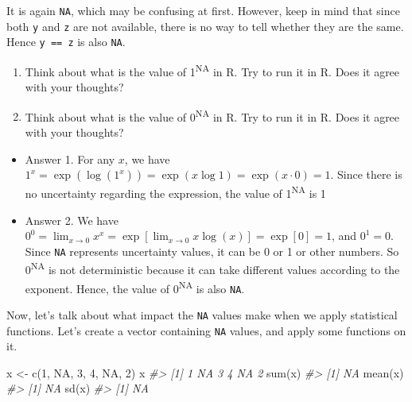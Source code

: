 \documentclass[
]{book}
\newenvironment{Shaded}{\begin{snugshade}}{\end{snugshade}}
\newcommand{\CommentTok}[1]{\textcolor[rgb]{0.56,0.35,0.01}{\textit{#1}}}
\newcommand{\ConstantTok}[1]{\textcolor[rgb]{0.00,0.00,0.00}{#1}}
\newcommand{\DecValTok}[1]{\textcolor[rgb]{0.00,0.00,0.81}{#1}}
\newcommand{\FunctionTok}[1]{\textcolor[rgb]{0.00,0.00,0.00}{#1}}
\newcommand{\NormalTok}[1]{#1}
\newcommand{\OtherTok}[1]{\textcolor[rgb]{0.56,0.35,0.01}{#1}}
\providecommand{\tightlist}{%
  \setlength{\itemsep}{0pt}\setlength{\parskip}{0pt}}
\newenvironment{blackbox}{
  \definecolor{shadecolor}{rgb}{0, 0, 0}  %
  \color{white}
  \begin{shaded}}
 {\end{shaded}}
\newenvironment{infobox}[1]
  {
  \begin{itemize}
  \renewcommand{\labelitemi}{
    \raisebox{-.7\height}[0pt][0pt]{
      {\setkeys{Gin}{width=3em,keepaspectratio}
        \texttt{[image: pics/\#1]}}
    }
  }
  \setlength{\fboxsep}{1em}
  \begin{blackbox}
  \item
  }
  {
  \end{blackbox}
  \end{itemize}
  }
\begin{document}
It is again \texttt{NA}, which may be confusing at first. However, keep in mind that since both \texttt{y} and \texttt{z} are not available, there is no way to tell whether they are the same. Hence \texttt{y\ ==\ z} is also \texttt{NA}.

\begin{infobox}{caution}

\begin{enumerate}
\def\labelenumi{\arabic{enumi}.}
\item
  Think about what is the value of 1\textsuperscript{NA} in R. Try to run it in R. Does it agree with your thoughts?
\item
  Think about what is the value of 0\textsuperscript{NA} in R. Try to run it in R. Does it agree with your thoughts?
\end{enumerate}

\begin{itemize}
\tightlist
\item
  Answer 1. For any \(x\), we have \(1^x = \exp(\log (1^x)) = \exp(x \log 1) = \exp(x \cdot 0) = 1\). Since there is no uncertainty regarding the expression, the value of 1\textsuperscript{NA} is 1
\item
  Answer 2. We have \(0^0 = \lim_{x\to 0}x^x =\exp[\lim_{x\to 0} x\log(x)]=\exp[0] = 1\), and \(0^1 = 0\). Since \texttt{NA} represents uncertainty values, it can be 0 or 1 or other numbers. So 0\textsuperscript{NA} is not deterministic because it can take different values according to the exponent. Hence, the value of 0\textsuperscript{NA} is also \texttt{NA}.
\end{itemize}

\end{infobox}

Now, let's talk about what impact the \texttt{NA} values make when we apply statistical functions. Let's create a vector containing \texttt{NA} values, and apply some functions on it.

\begin{Shaded}
\begin{Highlighting}[]
\NormalTok{x }\OtherTok{\textless{}{-}} \FunctionTok{c}\NormalTok{(}\DecValTok{1}\NormalTok{, }\ConstantTok{NA}\NormalTok{, }\DecValTok{3}\NormalTok{, }\DecValTok{4}\NormalTok{, }\ConstantTok{NA}\NormalTok{, }\DecValTok{2}\NormalTok{)}
\NormalTok{x}
\CommentTok{\#\textgreater{} [1]  1 NA  3  4 NA  2}
\FunctionTok{sum}\NormalTok{(x) }
\CommentTok{\#\textgreater{} [1] NA}
\FunctionTok{mean}\NormalTok{(x)}
\CommentTok{\#\textgreater{} [1] NA}
\FunctionTok{sd}\NormalTok{(x)}
\CommentTok{\#\textgreater{} [1] NA}
\end{Highlighting}
\end{Shaded}
\end{document}

